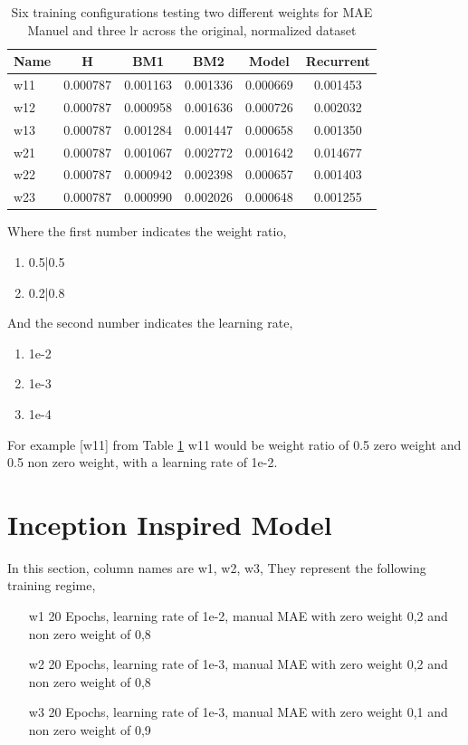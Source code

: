 \begin{table}[htbp]
	\centering
	\caption{Six training configurations testing two different weights for MAE Manuel and three lr across the original, normalized dataset}
	\label{tab:weighte_lr}
	\begin{tabular}{p{2cm}ccccc}
		\toprule
		Name &  H &  BM1 &  BM2 &  Model &  Recurrent \\
		\midrule
		w11 &       0.000787 &        0.001163 &        0.001336 &   0.000669 &            0.001453 \\
		w12 &       0.000787 &        0.000958 &        0.001636 &   0.000726 &            0.002032 \\
		w13 &       0.000787 &        0.001284 &        0.001447 &   0.000658 &            0.001350 \\
		w21 &       0.000787 &        0.001067 &        0.002772 &   0.001642 &            0.014677 \\
		w22 &       0.000787 &        0.000942 &        0.002398 &   0.000657 &            0.001403 \\
		w23 &       0.000787 &        0.000990 &        0.002026 &   0.000648 &            0.001255 \\
		\bottomrule
	\end{tabular}
\end{table}

Where the first number indicates the weight ratio,
\begin{enumerate}
	\item 0.5|0.5
	\item  0.2|0.8
\end{enumerate}

And the second number indicates the learning rate,
\begin{enumerate}
	\item  1e-2
	\item  1e-3
	\item  1e-4
\end{enumerate}
For example [w11] from Table \ref{tab:weighte_lr} w11 would be weight ratio of 0.5 zero weight and 0.5 non zero weight, with a learning rate of 1e-2.


\section{Inception Inspired Model}
In this section, column names are w1, w2, w3, They represent the following training regime,
\begin{enumerate}
	\item[w1] 20 Epochs, learning rate of 1e-2, manual MAE with zero weight 0,2 and non zero weight of 0,8
	\item[w2] 20 Epochs, learning rate of 1e-3, manual MAE with zero weight 0,2 and non zero weight of 0,8
	\item[w3] 20 Epochs, learning rate of 1e-3, manual MAE with zero weight 0,1 and non zero weight of 0,9
\end{enumerate}
